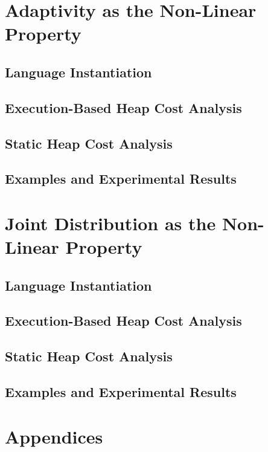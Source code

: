 \documentclass[a4paper,11pt]{article}
\begin{document}
\section{Adaptivity as the Non-Linear Property}
\label{sec:app-adapt}
\subsection{Language Instantiation}
\subsection{Execution-Based Heap Cost Analysis}
\subsection{Static Heap Cost Analysis}
\subsection{Examples and Experimental Results}


\clearpage
%
\section{Joint Distribution as the Non-Linear Property}
\label{sec:app-distr}
\subsection{Language Instantiation}
\subsection{Execution-Based Heap Cost Analysis}
\subsection{Static Heap Cost Analysis}
\subsection{Examples and Experimental Results}

%
\clearpage
\appendix
{}
\section*{Appendices}
% 



\end{document}
